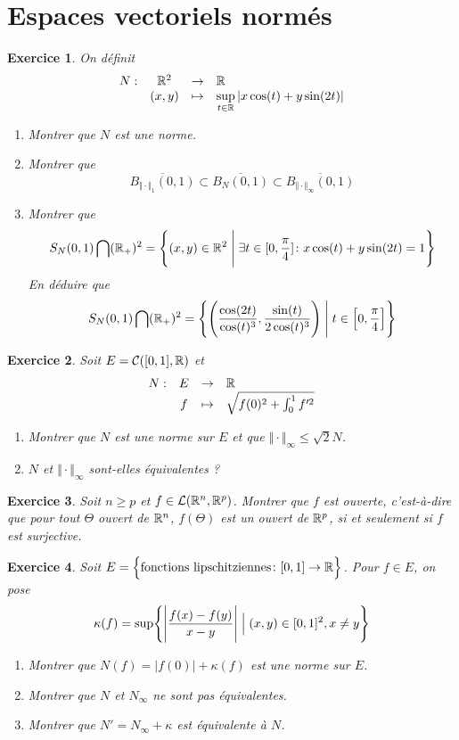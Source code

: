 \documentclass[12pt]{article}
\newtheorem{exercise}{Exercice}[section]
\theoremstyle{remark}
\theoremstyle{remark}
\newcommand{\function}[5]{
	$$
	\begin{array}{rccl}
		#1: & #2 & \to & #3 \\
		& #4 & \mapsto & #5
	\end{array}
	$$
}
\begin{document}
\cleardoublepage
\section{Espaces vectoriels normés}

\begin{exercise}
	On définit \function{N}{\R^{2}}{\R}{(x,y)}{\sup\limits_{t\in\R}\vert x\cos(t)+y\sin(2t)\vert}
	\begin{enumerate}
		\item Montrer que $N$ est une norme.
		\item Montrer que $$\overline{B_{\Vert\cdot\Vert_{1}}(0,1)}\subset \overline{B_{N}(0,1)}\subset\overline{B_{\Vert\cdot\Vert_{\infty}}(0,1)}$$
		\item Montrer que $$S_{N}(0,1)\bigcap(\mathbb{R}_{+})^{2}=\Biggl\{(x,y)\in\mathbb{R}^{2}\Biggm|\exists t\in[0,\frac{\pi}{4}]\colon x\cos(t)+y\sin(2t)=1\Biggr\}$$
		En déduire que $$S_{N}(0,1)\bigcap(\mathbb{R}_{+})^{2}=\Biggl\{\Biggl(\frac{\cos(2t)}{\cos(t)^{3}},\frac{\sin(t)}{2\cos(t)^{3}}\Biggr)\Biggm| t\in\Bigl[0,\frac{\pi}{4}\Bigr]\Biggr\}$$
	\end{enumerate}
\end{exercise}

\begin{exercise}
	Soit $E=\mathcal{C}([0,1],\mathbb{R})$ et \function{N}{E}{\R}{f}{\sqrt{f(0)^{2}+\int_{0}^{1}f'^{2}}}
	\begin{enumerate}
		\item Montrer que $N$ est une norme sur $E$ et que $\Vert\cdot\Vert_{\infty}\leqslant\sqrt{2}N$.
		\item $N$ et $\Vert\cdot\Vert_{\infty}$ sont-elles équivalentes ?
	\end{enumerate}
\end{exercise}

\begin{exercise}
	Soit $n\geqslant p$ et $f\in\mathcal{L}(\mathbb{R}^{n},\mathbb{R}^{p})$. Montrer que $f$ est ouverte, c'est-à-dire que pour tout $\Theta$ ouvert de $\mathbb{R}^{n}$, $f(\Theta)$ est un ouvert de $\mathbb{R}^{p}$, si et seulement si $f$ est surjective.
\end{exercise}

\begin{exercise}
	Soit $E=\Bigl\{\text{fonctions lipschitziennes}\colon [0,1]\to\mathbb{R}\Bigr\}$. Pour $f\in E$, on pose 
	$$\kappa(f)=\sup\Biggl\{\Biggl\lvert\frac{f(x)-f(y)}{x-y}\Biggr\rvert\Bigm|(x,y)\in[0,1]^{2},x\neq y\Biggr\}$$
	\begin{enumerate}
		\item Montrer que $N(f)=\vert f(0)\vert+\kappa(f)$ est une norme sur $E$.
		\item Montrer que $N$ et $N_{\infty}$ ne sont pas équivalentes.
		\item Montrer que $N'=N_{\infty}+\kappa$ est équivalente à $N$.
	\end{enumerate}
\end{exercise}
\end{document}
